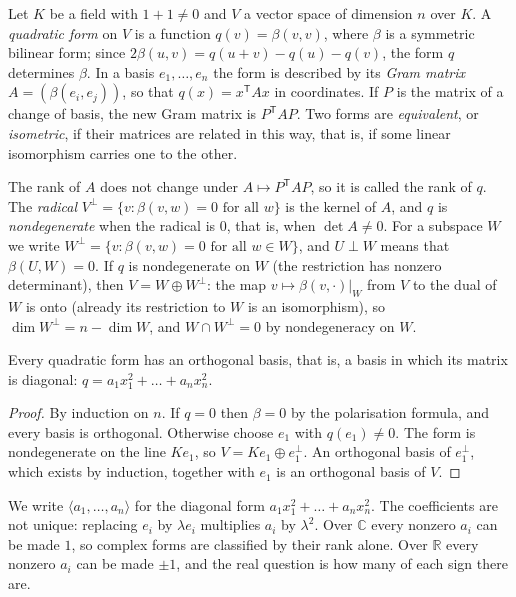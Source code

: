 Let $K$ be a field with $1+1\ne0$ and $V$ a vector space of dimension $n$ over $K$. A \emph{quadratic form} on $V$ is a function $q(v)=\beta(v,v)$,
where $\beta$ is a symmetric bilinear form; since $2\beta(u,v)=q(u+v)-q(u)-q(v)$, the form $q$ determines $\beta$. In a basis $e_1,\dots,e_n$ the
form is described by its \emph{Gram matrix} $A=(\beta(e_i,e_j))$, so that $q(x)=x^{\mathsf T}Ax$ in coordinates. If $P$ is the matrix of a change of
basis, the new Gram matrix is $P^{\mathsf T}AP$. Two forms are \emph{equivalent}, or \emph{isometric}, if their matrices are related in this way,
that is, if some linear isomorphism carries one to the other.

The rank of $A$ does not change under $A\mapsto P^{\mathsf T}AP$, so it is called the rank of $q$. The \emph{radical} $V^\perp=\{v:\beta(v,w)=0\text{ for all }w\}$
is the kernel of $A$, and $q$ is \emph{nondegenerate} when the radical is $0$, that is, when $\det A\ne0$. For a subspace $W$ we write
$W^\perp=\{v:\beta(v,w)=0\text{ for all }w\in W\}$, and $U\perp W$ means that $\beta(U,W)=0$. If $q$ is nondegenerate on $W$ (the restriction has
nonzero determinant), then $V=W\oplus W^\perp$: the map $v\mapsto\beta(v,\cdot)|_W$ from $V$ to the dual of $W$ is onto (already its restriction to
$W$ is an isomorphism), so $\dim W^\perp=n-\dim W$, and $W\cap W^\perp=0$ by nondegeneracy on $W$.

\begin{proposition}\label{prop:orthbasis}
Every quadratic form has an orthogonal basis, that is, a basis in which its matrix is diagonal: $q=a_1x_1^2+\dots+a_nx_n^2$.
\end{proposition}

\begin{proof}
By induction on $n$. If $q=0$ then $\beta=0$ by the polarisation formula, and every basis is orthogonal. Otherwise choose $e_1$ with $q(e_1)\ne0$.
The form is nondegenerate on the line $Ke_1$, so $V=Ke_1\oplus e_1^\perp$. An orthogonal basis of $e_1^\perp$, which exists by induction, together
with $e_1$ is an orthogonal basis of $V$.
\end{proof}

We write $\langle a_1,\dots,a_n\rangle$ for the diagonal form $a_1x_1^2+\dots+a_nx_n^2$. The coefficients are not unique: replacing $e_i$ by $\lambda
e_i$ multiplies $a_i$ by $\lambda^2$. Over $\mathbb C$ every nonzero $a_i$ can be made $1$, so complex forms are classified by their rank alone. Over
$\mathbb R$ every nonzero $a_i$ can be made $\pm1$, and the real question is how many of each sign there are.

